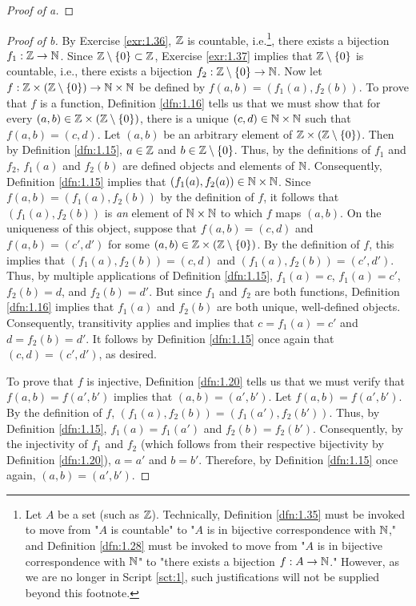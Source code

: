 \documentclass[../main.tex]{subfiles}
\begin{document}
\begin{theorem}
\begin{lemma*}
\begin{proof}[Proof of a]
        \end{proof}
        \begin{proof}[Proof of b]
            By Exercise \ref{exr:1.36}, $\mathbb{Z}$ is countable, i.e.\footnote{Let $A$ be a set (such as $\mathbb{Z}$). Technically, Definition \ref{dfn:1.35} must be invoked to move from "$A$ is countable" to "$A$ is in bijective correspondence with $\mathbb{N}$," and Definition \ref{dfn:1.28} must be invoked to move from "$A$ is in bijective correspondence with $\mathbb{N}$" to "there exists a bijection $f:A\to\mathbb{N}$." However, as we are no longer in Script \ref{sct:1}, such justifications will not be supplied beyond this footnote.}, there exists a bijection $f_1:\mathbb{Z}\to\mathbb{N}$. Since $\mathbb{Z}\setminus\{0\}\subset\mathbb{Z}$, Exercise \ref{exr:1.37} implies that $\mathbb{Z}\setminus\{0\}$ is countable, i.e., there exists a bijection $f_2:\mathbb{Z}\setminus\{0\}\to\mathbb{N}$. Now let $f:\mathbb{Z}\times(\mathbb{Z}\setminus\{0\})\to\mathbb{N}\times\mathbb{N}$ be defined by $f(a,b)=(f_1(a),f_2(b))$. To prove that $f$ is a function, Definition \ref{dfn:1.16} tells us that we must show that for every $(a,b)\in\mathbb{Z}\times(\mathbb{Z}\setminus\{0\})$, there is a unique $(c,d)\in\mathbb{N}\times\mathbb{N}$ such that $f(a,b)=(c,d)$. Let $(a,b)$ be an arbitrary element of $\mathbb{Z}\times(\mathbb{Z}\setminus\{0\})$. Then by Definition \ref{dfn:1.15}, $a\in\mathbb{Z}$ and $b\in\mathbb{Z}\setminus\{0\}$. Thus, by the definitions of $f_1$ and $f_2$, $f_1(a)$ and $f_2(b)$ are defined objects and elements of $\mathbb{N}$. Consequently, Definition \ref{dfn:1.15} implies that $(f_1(a),f_2(a))\in\mathbb{N}\times\mathbb{N}$. Since $f(a,b)=(f_1(a),f_2(b))$ by the definition of $f$, it follows that $(f_1(a),f_2(b))$ is \emph{an} element of $\mathbb{N}\times\mathbb{N}$ to which $f$ maps $(a,b)$. On the uniqueness of this object, suppose that $f(a,b)=(c,d)$ and $f(a,b)=(c',d')$ for some $(a,b)\in\mathbb{Z}\times(\mathbb{Z}\setminus\{0\})$. By the definition of $f$, this implies that $(f_1(a),f_2(b))=(c,d)$ and $(f_1(a),f_2(b))=(c',d')$. Thus, by multiple applications of Definition \ref{dfn:1.15}, $f_1(a)=c$, $f_1(a)=c'$, $f_2(b)=d$, and $f_2(b)=d'$. But since $f_1$ and $f_2$ are both functions, Definition \ref{dfn:1.16} implies that $f_1(a)$ and $f_2(b)$ are both unique, well-defined objects. Consequently, transitivity applies and implies that $c=f_1(a)=c'$ and $d=f_2(b)=d'$. It follows by Definition \ref{dfn:1.15} once again that $(c,d)=(c',d')$, as desired.\par
            To prove that $f$ is injective, Definition \ref{dfn:1.20} tells us that we must verify that $f(a,b)=f(a',b')$ implies that $(a,b)=(a',b')$. Let $f(a,b)=f(a',b')$. By the definition of $f$, $(f_1(a),f_2(b))=(f_1(a'),f_2(b'))$. Thus, by Definition \ref{dfn:1.15}, $f_1(a)=f_1(a')$ and $f_2(b)=f_2(b')$. Consequently, by the injectivity of $f_1$ and $f_2$ (which follows from their respective bijectivity by Definition \ref{dfn:1.20}), $a=a'$ and $b=b'$. Therefore, by Definition \ref{dfn:1.15} once again, $(a,b)=(a',b')$.\par

\end{proof}
\end{lemma*}
\end{theorem}
\end{document}
